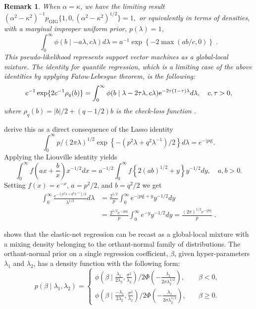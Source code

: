 \documentclass[11pt]{article}
\newtheorem{remark}[theorem]{Remark}
\begin{document}
\begin{remark}
When $\alpha = \kappa$, we have the limiting result $(\alpha^2-\kappa^2)^{-1} p_{\mathrm{GIG}}\{1,0, (\alpha^2-\kappa^2)^{1/2} \} = 1,$
or equivalently in terms of densities, with a marginal improper uniform prior, $p(\lambda) = 1$,
\begin{equation}
  \int_{0}^{\infty} \phi(b \mid -a\lambda, c\lambda) d\lambda = a^{-1} \exp\left\{-2 \max(ab/c,0)\right\}
  \;. 
  \label{eq:svm}
\end{equation}
This pseudo-likelihood represents support vector machines as a global-local mixture. The identity for quantile regression, which is a limiting case of the above identities by applying Fatou-Lebesgue theorem, is the following: 
\[
c^{-1}\exp\{ 2c^{-1} \rho_q(b) \}= \int_{0}^{\infty} \phi( b \mid \lambda - 2\tau \lambda, c \lambda){\rm e}^{-2\tau(1-\tau)\lambda} d\lambda, \quad c, \tau > 0,
\]
where $\rho_q(b) = \rvert b \lvert / 2 + (q-1/2) b$ is the check-loss function \citep{polson_data_2013}.
\end{remark}

\citet{polson_data_2011} derive this as a direct consequence of the Lasso identity 
\[
\int_0^{\infty} p/(2 \pi \lambda)^{1/2} \exp\left\{-\left(p^2 \lambda+q^2 \lambda^{-1}\right)/2\right\} d\lambda = e^{-\lvert pq \rvert}.
\]
Applying the Liouville identity yields
\[
\int_{0}^{\infty} f\left(ax + \frac{b}{x} \right) x^{-1/2} dx = a^{-1/2} \int_{0}^{\infty} f\left\{ 2 (ab)^{1/2} + y \right\} y^{-1/2} dy, \quad a, b > 0.
\]
Setting $f(x) = e^{-x}$, $a = p^2/2$, and $b = q^2/2$ we get
\begin{align*}
  \int_0^{\infty} \frac{e^{-(p^2 \lambda + q^2 \lambda^{-1})/2}}{\lambda^{1/2}} d\lambda
  & = \frac{2^{1/2}}{p} \int_0^{\infty} e^{-|pq| + y} y^{-1/2} d y \\
  & = \frac{2^{1/2} e^{-|pq|}}{p} \int_0^{\infty} e^{-y} y^{-1/2} d y 
  = \frac{(2\pi)^{1/2} e^{-|pq|}}{p}
  \;.
\end{align*}

\citet{hans2011comment} shows that the elastic-net regression can be recast as a
global-local mixture with a mixing density belonging to the orthant-normal
family of distributions.  The orthant-normal prior on a single regression
coefficient, $\beta$, given hyper-parameters $\lambda_1$ and $\lambda_2$, 
has a density function with the following form:
\begin{equation}
  p(\beta \mid \lambda_1, \lambda_2)  = 
  \begin{cases} 
   \phi(\beta \mid \frac{\lambda_1}{2\lambda_2}, \frac{\sigma^2}{\lambda_2}) 
   / 2\Phi\left(-\frac{\lambda_1}{2\sigma \lambda_2^{1/2} }\right), & \quad \beta < 0, 
   \\
   \phi(\beta \mid \frac{-\lambda_1}{2\lambda_2}, \frac{\sigma^2}{\lambda_2}) / 
   2\Phi\left(-\frac{\lambda_1}{2\sigma \lambda_2^{1/2} }\right), & \quad \beta \geq 0.
  \end{cases} 
  \;
  \label{eq:hans}
\end{equation}
\end{document}
